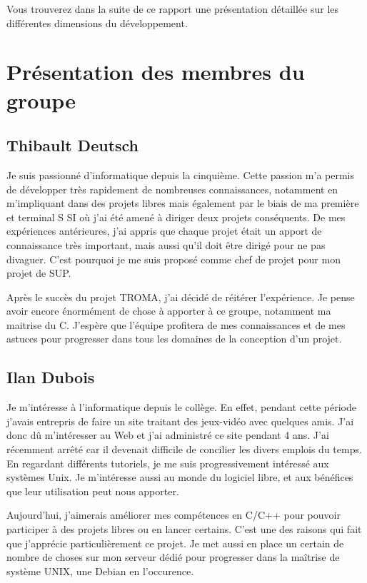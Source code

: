 \documentclass[11pt]{report}
\begin{document}
Vous trouverez dans la suite de ce rapport une présentation détaillée sur les différentes dimensions du développement.

\newpage
\section{Présentation des membres du groupe}

\subsection{Thibault Deutsch}

Je suis passionné d’informatique depuis la cinquième. Cette passion m’a permis de développer très rapidement de nombreuses connaissances, notamment en m’impliquant dans des projets libres mais également par le biais de ma première et terminal S SI où j’ai été amené à diriger deux projets conséquents. De mes expériences antérieures, j’ai appris que chaque projet était un apport de connaissance très important, mais aussi qu’il doit être dirigé pour ne pas divaguer. C’est pourquoi je me suis proposé comme chef de projet pour mon projet de SUP.

Après le succès du projet TROMA, j'ai décidé de réitérer l'expérience. Je pense avoir encore énormément de chose à apporter à ce groupe, notamment ma maitrise du C. J'espère que l'équipe profitera de mes connaissances et de mes astuces pour progresser dans tous les domaines de la conception d'un projet.

\subsection{Ilan Dubois}

Je m’intéresse à l’informatique depuis le collège. En effet, pendant cette période j’avais entrepris de faire un site traitant des jeux-vidéo avec quelques amis. J’ai donc dû m’intéresser au Web et j’ai administré ce site pendant 4 ans. J’ai récemment arrêté car il devenait difficile de concilier les divers emplois du temps. En regardant différents tutoriels, je me suis progressivement intéressé aux systèmes Unix. Je m’intéresse aussi au monde du logiciel libre, et aux bénéfices que leur utilisation peut nous apporter.

Aujourd'hui, j'aimerais améliorer mes compétences en C/C++ pour pouvoir participer à des projets libres ou en lancer certains. C'est une des raisons qui fait que j'apprécie particulièrement ce projet. Je met aussi en place un certain de nombre de choses sur mon serveur dédié pour progresser dans la maîtrise de système UNIX, une Debian en l'occurence.
\end{document}
